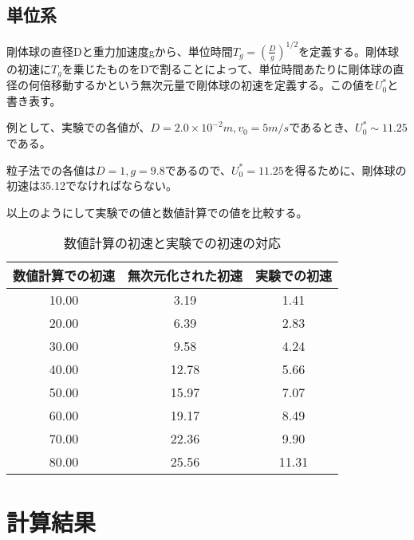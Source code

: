 \documentclass[]{jsarticle}
\begin{document}
\subsection{単位系}
剛体球の直径Dと重力加速度gから、単位時間$T_g=(\frac{D}{g})^{1/2}$を定義する。剛体球の初速に$T_g$を乗じたものをDで割ることによって、単位時間あたりに剛体球の直径の何倍移動するかという無次元量で剛体球の初速を定義する。この値を$U_0^*$と書き表す。

例として、実験での各値が、$D=2.0\times10^{-2}m,v_0=5m/s$であるとき、$U_0^*\sim11.25$である。

粒子法での各値は$D=1, g=9.8$であるので、$U_0^*=11.25$を得るために、剛体球の初速は35.12でなければならない。

以上のようにして実験での値と数値計算での値を比較する。
\begin{table}[h]
  \caption{数値計算の初速と実験での初速の対応}
  \label{tab:velocity_non_dim}
  \begin{center}
    \begin{tabular}{|c|c|c|}\hline
      数値計算での初速&無次元化された初速&実験での初速 \\ \hline
      10.00 & 3.19 & 1.41 \\ \hline
      20.00 & 6.39 & 2.83 \\ \hline
      30.00 & 9.58 & 4.24 \\ \hline
      40.00 & 12.78 & 5.66 \\ \hline
      50.00 & 15.97 & 7.07 \\ \hline
      60.00 & 19.17 & 8.49 \\ \hline
      70.00 & 22.36 & 9.90 \\ \hline
      80.00 & 25.56 & 11.31 \\ \hline
    \end{tabular}
  \end{center}
\end{table}



\newpage
\section{計算結果}
\end{document}
